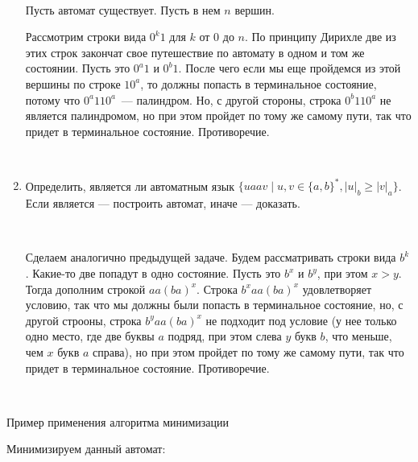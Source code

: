 \documentclass[12pt]{article}
\begin{document}
\begin{enumerate}
      \

      Пусть автомат существует. Пусть в нем $n$ вершин.

      Рассмотрим строки вида $0^k 1$ для $k$ от $0$ до $n$.
      По принципу Дирихле две из этих строк закончат свое путешествие по автомату в одном и том же состоянии.
      Пусть это $0^a 1$ и $0^b 1$. После чего если мы еще пройдемся из этой вершины по строке $1 0^a$, то должны попасть в терминальное
      состояние, потому что $0^a 1 1 0^a$~--- палиндром. Но, с другой стороны, строка $0^b 1 1 0^a$ не является палиндромом, но при этом пройдет по тому же самому пути, так что придет в терминальное состояние. Противоречие.
      
      \

  \item Определить, является ли автоматным язык $\{ u a a v \mid u, v \in \{ a, b \}^* , |u|_b \geq |v|_a \}$. Если является --- построить автомат, иначе --- доказать.

      \

          Сделаем аналогично предыдущей задаче. Будем рассматривать строки вида $b^k$.
          Какие-то две попадут в одно состояние. Пусть это $b^x$ и $b^y$, при этом $x > y$.
          Тогда дополним строкой $a a (ba)^x$. Строка $b^x a a (ba)^x$ удовлетворяет условию, так что мы должны были попасть в терминальное состояние, но, с другой строоны, строка $b^y a a (ba)^x$ не подходит под условие (у нее только одно место, где две буквы  $a$ подряд, при этом слева $y$ букв $b$, что меньше, чем $x$ букв $a$ справа), но при этом пройдет по тому же самому пути, так что придет в терминальное состояние. Противоречие.

      \
\end{enumerate}

\newpage

\begin{center}
  \Large{Пример применения алгоритма минимизации}
\end{center}

\bigskip

Минимизируем данный автомат:
\end{document}
